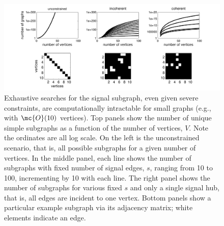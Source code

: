 \documentclass[10pt,journal,cspaper,compsoc]{IEEEtran}
\begin{document}



\begin{figure}[tb!]
	\centering
		\includegraphics[width=1.0\linewidth]{../figs/num_of_graphs.pdf}
	\caption{Exhaustive searches for the signal subgraph, even given severe constraints, are computationally intractable for small graphs (e.g., with $\mc{O}(10)$ vertices).  Top panels show the number of unique simple subgraphs as a function of the number of vertices, $V$.  Note the ordinates are all log scale.   On the left is the unconstrained scenario, that is, all possible subgraphs for a given number of vertices.  In the middle panel, each line shows the number of subgraphs with fixed number of signal edges, $s$, ranging from 10 to 100, incrementing by 10 with each line.  The right panel shows the number of subgraphs for various fixed $s$ and only a single signal hub, that is, all edges are incident to one vertex.  Bottom panels show a particular example subgraph via its adjacency matrix; white elements indicate an edge.}
	\label{fig:numgraphs}
\end{figure}
\end{document}
